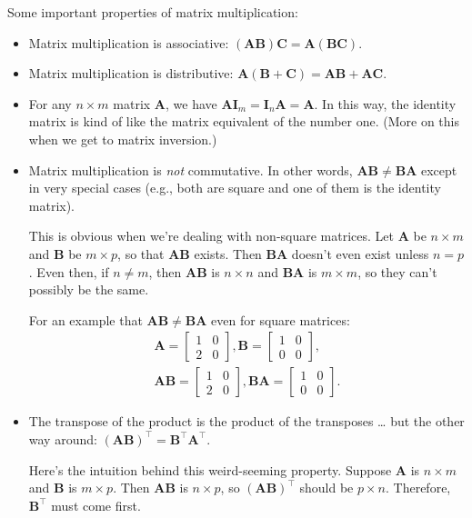 \documentclass[
  12pt,
  oneside,openany]{book}
\begin{document}
Some important properties of matrix multiplication:

\begin{itemize}
\item
  Matrix multiplication is associative: \((\mathbf{A} \mathbf{B}) \mathbf{C} = \mathbf{A} (\mathbf{B} \mathbf{C})\).
\item
  Matrix multiplication is distributive: \(\mathbf{A} (\mathbf{B} + \mathbf{C}) = \mathbf{A} \mathbf{B} + \mathbf{A} \mathbf{C}\).
\item
  For any \(n \times m\) matrix \(\mathbf{A}\), we have \(\mathbf{A} \mathbf{I}_m = \mathbf{I}_n \mathbf{A} = \mathbf{A}\). In this way, the identity matrix is kind of like the matrix equivalent of the number one. (More on this when we get to matrix inversion.)
\item
  Matrix multiplication is \emph{not} commutative. In other words, \(\mathbf{A} \mathbf{B} \neq \mathbf{B} \mathbf{A}\) except in very special cases (e.g., both are square and one of them is the identity matrix).

  This is obvious when we're dealing with non-square matrices. Let \(\mathbf{A}\) be \(n \times m\) and \(\mathbf{B}\) be \(m \times p\), so that \(\mathbf{A} \mathbf{B}\) exists. Then \(\mathbf{B} \mathbf{A}\) doesn't even exist unless \(n = p\). Even then, if \(n \neq m\), then \(\mathbf{A} \mathbf{B}\) is \(n \times n\) and \(\mathbf{B} \mathbf{A}\) is \(m \times m\), so they can't possibly be the same.

  For an example that \(\mathbf{A} \mathbf{B} \neq \mathbf{B} \mathbf{A}\) even for square matrices: \[\begin{gathered}
  \mathbf{A} = \begin{bmatrix}
    1 & 0 \\
    2 & 0
  \end{bmatrix},
  \mathbf{B} = \begin{bmatrix}
    1 & 0 \\
    0 & 0
  \end{bmatrix}, \\
  \mathbf{A} \mathbf{B} = \begin{bmatrix}
    1 & 0 \\
    2 & 0
  \end{bmatrix},
  \mathbf{B} \mathbf{A} = \begin{bmatrix}
    1 & 0 \\
    0 & 0
  \end{bmatrix}.
  \end{gathered}
  \]
\item
  The transpose of the product is the product of the transposes \ldots{} but the other way around: \((\mathbf{A} \mathbf{B})^\top = \mathbf{B}^\top \mathbf{A}^\top\).

  Here's the intuition behind this weird-seeming property. Suppose \(\mathbf{A}\) is \(n \times m\) and \(\mathbf{B}\) is \(m \times p\). Then \(\mathbf{A} \mathbf{B}\) is \(n \times p\), so \((\mathbf{A} \mathbf{B})^\top\) should be \(p \times n\). Therefore, \(\mathbf{B}^\top\) must come first.
\end{itemize}
\end{document}
